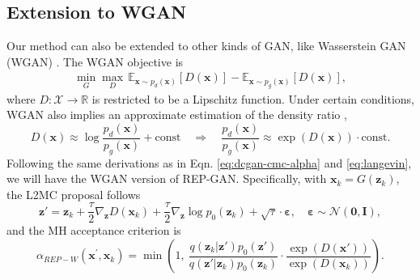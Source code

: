 \documentclass{article} %
\newcommand{\bx}{\mathbf{x}}
\newcommand{\bz}{\mathbf{z}}
\newcommand{\bI}{\mathbf{I}}
\newcommand{\bvarepsilon}{\bm{\varepsilon}}
\newcommand{\cN}{\mathcal{N}}
\newcommand{\cX}{\mathcal{X}}
\newcommand{\bbR}{\mathbb{R}}
\newcommand{\bzero}{\mathbf{0}}
\newcommand{\<}{\left\langle}
\renewcommand{\>}{\right\rangle}
\begin{document}
\subsection{Extension to WGAN}
Our method can also be extended to other kinds of GAN, like Wasserstein GAN (WGAN) \citep{arjovsky2017wasserstein}.
The WGAN objective is
\begin{align}
\min_G\max_D\,\mathbb{E}_{\bx\sim p_{d}(\bx)}[D(\bx)]-\mathbb{E}_{\bx\sim p_{g}(\bx)}[D(\bx)],
\end{align}
where $D:\cX\to\bbR$ is restricted to be a Lipschitz function. Under certain conditions, WGAN also implies an approximate estimation of the density ratio \citep{che2020your},
\begin{equation}
D(\bx)\approx\log\frac{p_d(\bx)}{p_g(\bx)}+\text{const}\quad\Rightarrow\quad\frac{p_d(\bx)}{p_g(\bx)}\approx\exp(D(\bx))\cdot \text{const}.
\end{equation}
Following the same derivations as in Eqn. \eqref{eq:dcgan-cmc-alpha} and \eqref{eq:langevin}, we will have the WGAN version of REP-GAN. Specifically, with $\bx_k=G(\bz_k)$, the L2MC proposal follows
\begin{equation}
\bz'=\bz_k+\frac{\tau}{2}\nabla_{\bz}D(\bx_k)+\frac{\tau}{2}\nabla_{\bz}\log p_0(\bz_k)+\sqrt{\tau}\cdot\bvarepsilon, \quad\bvarepsilon\sim\cN(\bzero,\bI),
\label{eq:wgan-proposal}
\end{equation}
and the MH acceptance criterion is 
\begin{equation}
\alpha_{REP-W}\left(\mathbf{x}^{\prime},\mathbf{x}_{k}\right)=\min \left(1,~ \frac{q(\bz_k|\bz')p_0(\bz')}{q(\bz'|\bz_k)p_0(\bz_k)}\cdot\frac{\exp\left(D(\bx')\right)}{\exp\left(D(\bx_k)\right)}\right).
\end{equation}
\end{document}
